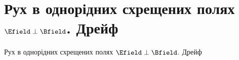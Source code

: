 \documentclass[onlytextwidth]{beamer}
\begin{document}
\section{Рух в однорідних схрещених полях \texorpdfstring{$\Efield\perp\Bfield$}{E⟂B}. Дрейф}


\begin{frame}{Рух в однорідних схрещених полях $\Efield\perp\Bfield$. Дрейф}{}

\end{frame}
\end{document}
